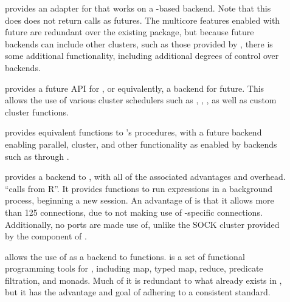 \begin{description}
    \item[]
        \textcite{bengtsson20do} provides an adapter for \cite{microsoft20}
        that works on a -based backend. Note that this does does not
        return  calls as futures. The multicore features enabled with
        future are redundant over the existing  package, but because
        future backends can include other clusters, such as those provided by
        , there is some additional functionality, including additional
        degrees of control over backends.
    \item[]
        \cite{bengtsson19batch} provides a future API for
        \cite{lang17}, or equivalently, a  backend for
        future. This allows the use of various cluster schedulers such as
        , , , as well as custom cluster functions.
    \item[]
        \textcite{bengtsson20apply} provides equivalent functions to \R{}'s
         procedures, with a future backend enabling parallel,
        cluster, and other functionality as enabled by backends such as
         through .
    \item[]
        \textcite{bengtsson19callr} provides a \cite{csardi20} backend to
        , with all of the associated advantages and overhead. 
        ``calls \R{} from R''. It provides functions to run expressions in a
        background \R{} process, beginning a new session. An advantage of  is
        that it allows more than 125 connections, due to not making use of
        \R{}-specific connections. Additionally, no ports are made use of, unlike
        the SOCK cluster provided by the  component of .
    \item[]
        \textcite{vaughan18} allows the use of  as a backend to 
        functions.  is a set of functional programming tools for \R{},
        including map, typed map, reduce, predicate filtration, and monads. Much of it is
        redundant to what already exists in \R{}, but it has the advantage and goal
        of adhering to a consistent standard.
\end{description}

